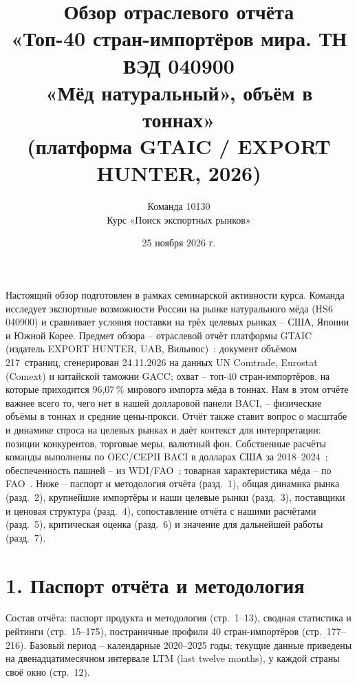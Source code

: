 \documentclass[11pt,a4paper]{article}
\title{Обзор отраслевого отчёта\\
«Топ-40 стран-импортёров мира. ТН ВЭД 040900\\
«Мёд натуральный», объём в тоннах»\\
(платформа GTAIC / EXPORT HUNTER, 2026)}
\author{Команда 10130\\Курс «Поиск экспортных рынков»}
\date{25 ноября 2026 г.}
\begin{document}
\maketitle

\noindent Настоящий обзор подготовлен в рамках семинарской активности курса. Команда исследует
экспортные возможности России на рынке натурального мёда (HS6 040900) и сравнивает условия
поставки на трёх целевых рынках -- США, Японии и Южной Корее. Предмет обзора -- отраслевой
отчёт платформы GTAIC (издатель EXPORT HUNTER, UAB, Вильнюс)~\cite{gtaic2026}: документ объёмом
217~страниц, сгенерирован 24.11.2026 на данных UN Comtrade, Eurostat (Comext) и китайской
таможни GACC; охват -- топ-40 стран-импортёров, на которые приходится 96{,}07\,\% мирового
импорта мёда в тоннах. Нам в этом отчёте важнее всего то, чего нет в нашей долларовой панели
BACI, -- физические объёмы в тоннах и средние цены-прокси. Отчёт также ставит вопрос
о масштабе и динамике спроса на целевых рынках и даёт контекст для интерпретации: позиции
конкурентов, торговые меры, валютный фон. Собственные расчёты команды выполнены
по OEC/CEPII BACI в долларах США за 2018--2024~\cite{oecbaci}; обеспеченность пашней --
из WDI/FAO~\cite{wdi}; товарная характеристика мёда -- по FAO~\cite{bradbear}. Ниже -- паспорт и
методология отчёта (разд.~1), общая динамика рынка (разд.~2), крупнейшие импортёры и наши
целевые рынки (разд.~3), поставщики и ценовая структура (разд.~4), сопоставление отчёта с
нашими расчётами (разд.~5), критическая оценка (разд.~6) и значение для дальнейшей работы
(разд.~7).

\section*{1. Паспорт отчёта и методология}

Состав отчёта: паспорт продукта и методология (стр.~1--13), сводная статистика и рейтинги
(стр.~15--175), постраничные профили 40 стран-импортёров (стр.~177--216). Базовый период --
календарные 2020--2025 годы; текущие данные приведены на двенадцатимесячном интервале LTM
(last twelve months), у каждой страны своё окно (стр.~12).
\end{document}
